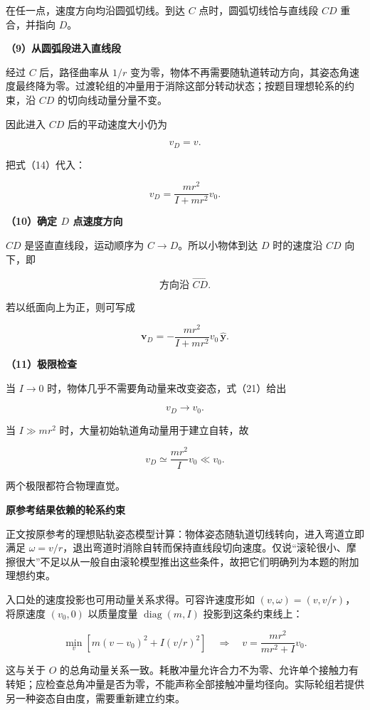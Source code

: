 \documentclass[12pt,a4paper,UTF8]{ctexart}
\begin{document}
在任一点，速度方向均沿圆弧切线。到达 \(C\) 点时，圆弧切线恰与直线段
\(CD\) 重合，并指向 \(D\)。

\textbf{（9）从圆弧段进入直线段}

经过 \(C\) 后，路径曲率从 \(1/r\)
变为零，物体不再需要随轨道转动方向，其姿态角速度最终降为零。过渡轮组的冲量用于消除这部分转动状态；按题目理想轮系的约束，沿
\(CD\) 的切向线动量分量不变。

因此进入 \(CD\) 后的平动速度大小仍为

\[
v_D=v.
\tag{20}
\]

把式（14）代入：

\[
\boxed{
v_D=\frac{mr^2}{I+mr^2}v_0
}.
\tag{21}
\]

\textbf{（10）确定 \(D\) 点速度方向}

\(CD\) 是竖直直线段，运动顺序为 \(C\to D\)。所以小物体到达 \(D\)
时的速度沿 \(CD\) 向下，即

\[
\boxed{\text{方向沿 }\overrightarrow{CD}}.
\tag{22}
\]

若以纸面向上为正，则可写成

\[
\boxed{
\boldsymbol v_D
=-\frac{mr^2}{I+mr^2}v_0\,\hat{\boldsymbol y}
}.
\tag{23}
\]

\textbf{（11）极限检查}

当 \(I\to0\) 时，物体几乎不需要角动量来改变姿态，式（21）给出

\[
v_D\to v_0.
\]

当 \(I\gg mr^2\) 时，大量初始轨道角动量用于建立自转，故

\[
v_D\simeq\frac{mr^2}{I}v_0\ll v_0.
\]

两个极限都符合物理直觉。

\textbf{原参考结果依赖的轮系约束}

正文按原参考的理想贴轨姿态模型计算：物体姿态随轨道切线转向，进入弯道立即满足
\(\omega=v/r\)，退出弯道时消除自转而保持直线段切向速度。仅说``滚轮很小、摩擦很大''不足以从一般自由滚轮模型推出这些条件，故把它们明确列为本题的附加理想约束。

入口处的速度投影也可用动量关系求得。可容许速度形如
\((v,\omega)=(v,v/r)\)，将原速度 \((v_0,0)\) 以质量度量
\(\operatorname{diag}(m,I)\) 投影到这条约束线上：

\[\min_v\left[m(v-v_0)^2+I(v/r)^2\right]\quad\Rightarrow\quad v=\frac{mr^2}{mr^2+I}v_0.\]

这与关于 \(O\)
的总角动量关系一致。耗散冲量允许合力不为零、允许单个接触力有转矩；应检查总角冲量是否为零，不能声称全部接触冲量均径向。实际轮组若提供另一种姿态自由度，需要重新建立约束。
\end{document}

